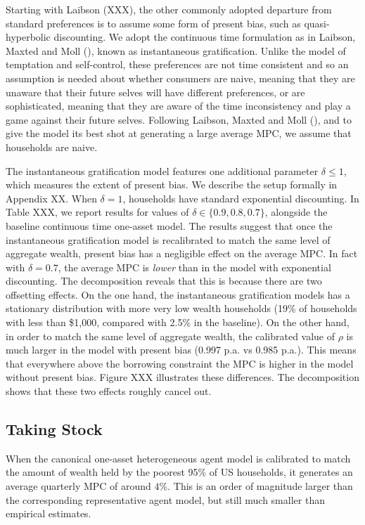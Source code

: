 Starting with Laibson (XXX), the other commonly adopted departure from standard preferences is to assume some form of present bias, such as quasi-hyperbolic discounting. We adopt the continuous time formulation as in Laibson, Maxted and Moll (), known as instantaneous gratification. Unlike the model of temptation and self-control, these preferences are not time consistent and so an assumption is needed about whether consumers are naive, meaning that they are unaware that their future selves will have different preferences, or are sophisticated, meaning that they are aware of the time inconsistency and play a game against their future selves. Following Laibson, Maxted and Moll (), and to give the model its best shot at generating a large average MPC, we assume that households are naive.

The instantaneous gratification model features one additional parameter $\delta \leq 1$, which measures the extent of present bias. We describe the setup formally in Appendix XX. When $\delta =1$, households have standard exponential discounting. In Table XXX, we report results for values of $\delta \in \{0.9,0.8,0.7\}$, alongside the baseline continuous time one-asset model. The results suggest that once the instantaneous gratification model is recalibrated to match the same level of aggregate wealth, present bias has a negligible effect on the average MPC. In fact with $\delta=0.7$, the average MPC is \emph{lower} than in the model with exponential discounting. The decomposition reveals that this is because there are two offsetting effects. On the one hand, the instantaneous gratification models has a stationary distribution with more very low wealth households (19\% of households with less than \$1,000, compared with 2.5\% in the baseline). On the other hand, in order to match the same level of aggregate wealth, the calibrated value of $\rho$ is much larger in the model with present bias (0.997 p.a. vs 0.985 p.a.). This means that everywhere above the borrowing constraint the MPC is higher in the model without present bias. Figure XXX illustrates these differences. The decomposition shows that these two effects roughly cancel out.

\subsection{Taking Stock}

When the canonical one-asset heterogeneous agent model is calibrated to match the amount of wealth held by the poorest 95\% of US households, it generates an average quarterly MPC of around $4\%$. This is an order of magnitude larger than the corresponding representative agent model, but still much  smaller than empirical estimates.


